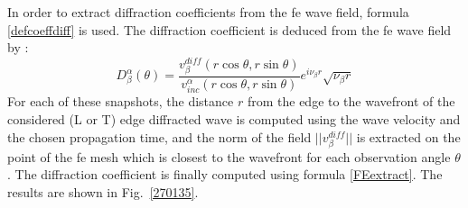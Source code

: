 In order to extract diffraction coefficients from the \acrshort{fe} wave field, formula \eqref{defcoeffdiff} is used. The diffraction coefficient is deduced from the \acrshort{fe} wave field by :
\begin{equation}
D_{\beta}^{\alpha}(\theta)=\frac{v^{diff}_{\beta}(r\cos\theta,r\sin\theta)}{v_{inc}^{\alpha}(r\cos\theta,r\sin\theta)}e^{i\nu_{\beta}r}\sqrt{\nu_{\beta}r}
\label{FEextract}
\end{equation}
For each of these snapshots, the distance $r$ from the edge to the wavefront of the considered (L or T) edge diffracted wave is computed using the wave velocity and the chosen propagation time, and the norm of the field $||v^{diff}_{\beta}||$ is extracted on the point of the \acrshort{fe} mesh which is closest to the wavefront for each observation angle $\theta$. The diffraction coefficient is finally computed using formula \eqref{FEextract}. The results are shown in Fig.~\ref{270135}.

